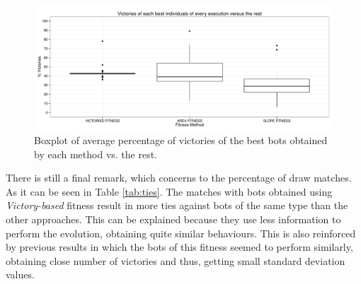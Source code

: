 \documentclass[preprint]{elsarticle}
\begin{document}

 \begin{figure}[ht]
 \begin{center}
   \includegraphics[width=12cm]{nuevas_imgs/batallas_Boxplot.pdf}
 \end{center}
 \caption{Boxplot of average percentage of victories of the best bots obtained by each method vs. the rest.}
 \label{figura:boxplotvictories}
 \end{figure}


There is still a final remark, which concerns to the percentage of draw matches.
As it can be seen in Table \ref{tab:ties}. The matches with bots obtained using \textit{Victory-based}
fitness  result in more ties against bots of the same type than the
other approaches. %
This can be explained because they use less
information to perform the evolution, obtaining quite similar
behaviours. %
This is also reinforced by previous results in which the
bots of this fitness seemed to perform similarly, obtaining close
number of victories and thus, getting small standard deviation
values. 
\end{document}
